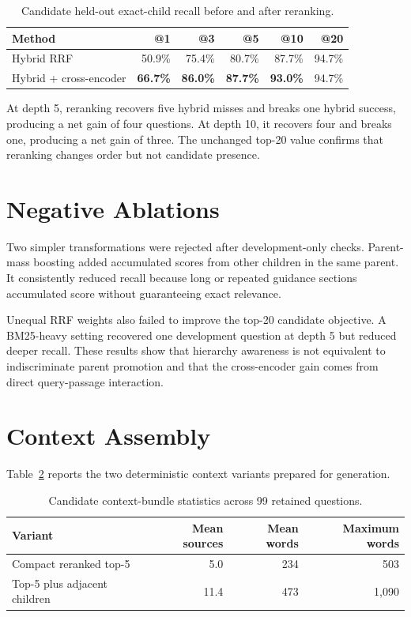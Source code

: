 \begin{table}[htbp]
  \centering
  \caption{Candidate held-out exact-child recall before and after reranking.}
  \label{tab:rerank-test}
  \begin{tabular}{lrrrrr}
    \toprule
    \textbf{Method} & \textbf{@1} & \textbf{@3} & \textbf{@5} & \textbf{@10} & \textbf{@20} \\
    \midrule
    Hybrid RRF & 50.9\% & 75.4\% & 80.7\% & 87.7\% & 94.7\% \\
    Hybrid + cross-encoder & \textbf{66.7\%} & \textbf{86.0\%} & \textbf{87.7\%} & \textbf{93.0\%} & 94.7\% \\
    \bottomrule
  \end{tabular}
\end{table}

At depth 5, reranking recovers five hybrid misses and breaks one hybrid success, producing a net gain of four questions. At depth 10, it recovers four and breaks one, producing a net gain of three. The unchanged top-20 value confirms that reranking changes order but not candidate presence.

\section{Negative Ablations}

Two simpler transformations were rejected after development-only checks. Parent-mass boosting added accumulated scores from other children in the same parent. It consistently reduced recall because long or repeated guidance sections accumulated score without guaranteeing exact relevance.

Unequal RRF weights also failed to improve the top-20 candidate objective. A BM25-heavy setting recovered one development question at depth 5 but reduced deeper recall. These results show that hierarchy awareness is not equivalent to indiscriminate parent promotion and that the cross-encoder gain comes from direct query-passage interaction.

\section{Context Assembly}

Table~\ref{tab:contexts} reports the two deterministic context variants prepared for generation.

\begin{table}[htbp]
  \centering
  \caption{Candidate context-bundle statistics across 99 retained questions.}
  \label{tab:contexts}
  \begin{tabular}{lrrr}
    \toprule
    \textbf{Variant} & \textbf{Mean sources} & \textbf{Mean words} & \textbf{Maximum words} \\
    \midrule
    Compact reranked top-5 & 5.0 & 234 & 503 \\
    Top-5 plus adjacent children & 11.4 & 473 & 1,090 \\
    \bottomrule
  \end{tabular}
\end{table}

